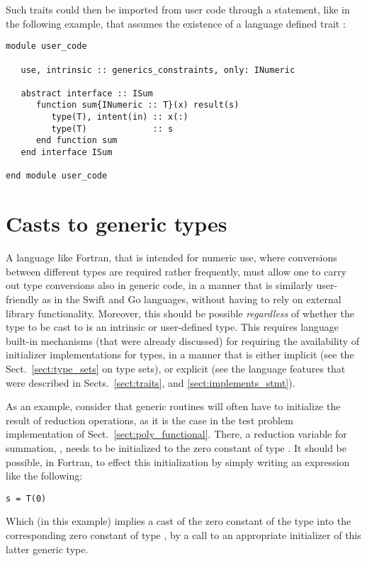 \documentclass[11pt,oneside]{report}
\newcommand{\code}[1]{{\selectfont\ttfamily{#1}}}
\begin{document}
Such traits could then be imported from user code through a \code{use}
statement, like in the following example, that assumes the existence of
a language defined trait \code{INumeric}:
\begin{lstlisting}[language=LFortran,style=boxed]
module user_code

   use, intrinsic :: generics_constraints, only: INumeric

   abstract interface :: ISum
      function sum{INumeric :: T}(x) result(s)
         type(T), intent(in) :: x(:)
         type(T)             :: s
      end function sum
   end interface ISum

end module user_code
\end{lstlisting}


\section{Casts to generic types}

A language like Fortran, that is intended for numeric use, where
conversions between different types are required rather frequently,
must allow one to carry out type conversions also in generic code, in
a manner that is similarly user-friendly as in the Swift and Go
languages, without having to rely on external library
functionality. Moreover, this should be possible \emph{regardless} of
whether the type to be cast to is an intrinsic or user-defined
type. This requires language built-in mechanisms (that were already
discussed) for requiring the availability of initializer
implementations for types, in a manner that is either implicit (see
the Sect.~\ref{sect:type_sets} on type sets), or explicit (see the
language features that were described in Sects.~\ref{sect:traits},
and \ref{sect:implements_stmt}).

As an example, consider that generic routines will often have to
initialize the result of reduction operations, as it is the case in
the test problem implementation of
Sect.~\ref{sect:poly_functional}. There, a reduction variable for
summation, \code{s}, needs to be initialized to the zero constant of
type \code{T}. It should be possible, in Fortran, to effect this
initialization by simply writing an expression like the following:
\begin{lstlisting}[language=LFortran,style=boxed]
  s = T(0)
\end{lstlisting}  
Which (in this example) implies a cast of the zero constant of the
\code{integer} type into the corresponding zero constant of type
\code{T}, by a call to an appropriate initializer of this latter
generic type.
\end{document}
